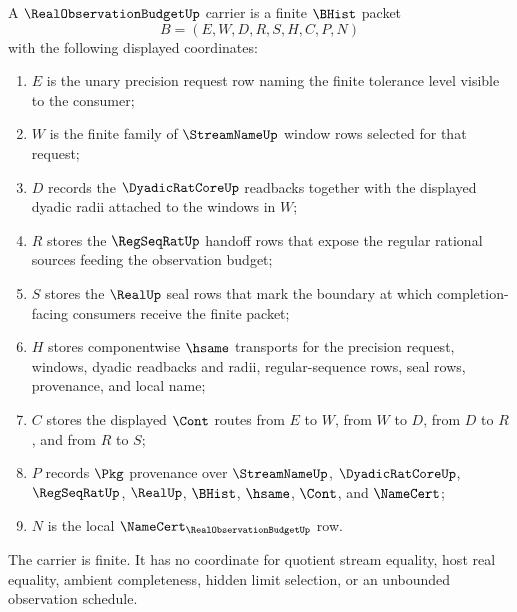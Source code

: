 \begin{definition}
\label{def:real-observation-budget-carrier}
A $\RealObservationBudgetUp$ carrier is a finite $\BHist$ packet
$$
B=(E,W,D,R,S,H,C,P,N)
$$
with the following displayed coordinates:
\begin{enumerate}
\item $E$ is the unary precision request row naming the finite tolerance level visible to the consumer;
\item $W$ is the finite family of $\StreamNameUp$ window rows selected for that request;
\item $D$ records the $\DyadicRatCoreUp$ readbacks together with the displayed dyadic radii attached to the windows in $W$;
\item $R$ stores the $\RegSeqRatUp$ handoff rows that expose the regular rational sources feeding the observation budget;
\item $S$ stores the $\RealUp$ seal rows that mark the boundary at which completion-facing consumers receive the finite packet;
\item $H$ stores componentwise $\hsame$ transports for the precision request, windows, dyadic readbacks and radii, regular-sequence rows, seal rows, provenance, and local name;
\item $C$ stores the displayed $\Cont$ routes from $E$ to $W$, from $W$ to $D$, from $D$ to $R$, and from $R$ to $S$;
\item $P$ records $\Pkg$ provenance over $\StreamNameUp$, $\DyadicRatCoreUp$, $\RegSeqRatUp$, $\RealUp$, $\BHist$, $\hsame$, $\Cont$, and $\NameCert$;
\item $N$ is the local $\NameCert_{\RealObservationBudgetUp}$ row.
\end{enumerate}
The carrier is finite. It has no coordinate for quotient stream equality, host real equality, ambient completeness, hidden limit selection, or an unbounded observation schedule.
\end{definition}

